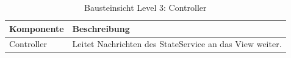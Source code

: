 \begin{table}[h!]
\centering
\begin{tabular}{|p{4cm}|p{9cm}|}
\hline
\textbf{Komponente} & \textbf{Beschreibung} \\ \hline
Controller & Leitet Nachrichten des StateService an das View weiter. \\ \hline 
\end{tabular}
\caption{Bausteinsicht Level 3: Controller}
\label{tab:lvl3}
\end{table}



